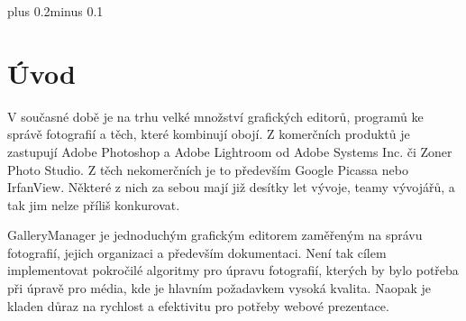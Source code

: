 \documentclass[11pt,twoside,a4paper]{book}
\begin{document}

\tableofcontents



\listoffigures



\listoftables



\mainbodystarts
\normalfont
{}\baselineskip plus 0.2\baselineskip minus 0.1\baselineskip



% 
% 


\chapter{Úvod}

\noindent
V současné době je na trhu velké množství grafických editorů, programů ke správě fotografií a těch, které kombinují obojí. Z komerčních produktů je zastupují Adobe Photoshop a Adobe Lightroom od Adobe Systems Inc. či Zoner Photo Studio. Z těch nekomerčních je to především Google Picassa nebo IrfanView. Některé z nich za sebou mají již desítky let vývoje, teamy vývojářů, a tak jim nelze příliš konkurovat.

\indent
GalleryManager je jednoduchým grafickým editorem zaměřeným na správu fotografií, jejich organizaci a především dokumentaci. Není tak cílem implementovat pokročilé algoritmy pro úpravu fotografií, kterých by bylo potřeba při úpravě pro média, kde je hlavním požadavkem vysoká kvalita. Naopak je kladen důraz na rychlost a efektivitu pro potřeby webové prezentace.
\end{document}
